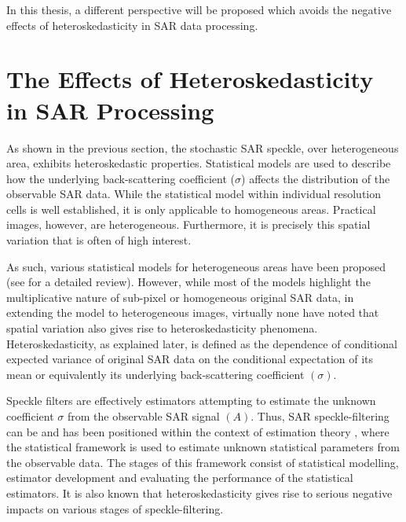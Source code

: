 In this thesis, a different perspective will be proposed which avoids the negative effects of heteroskedasticity in SAR data processing.
 
\section{The Effects of Heteroskedasticity in SAR Processing}%
\label{sec:heteroskedastic_sar_processing}


As shown in the previous section,
  the stochastic SAR speckle, over heterogeneous area, exhibits heteroskedastic properties.
Statistical models are used to describe how the underlying back-scattering coefficient ($\sigma$) affects the distribution of the observable SAR data. 
While the statistical model within individual resolution cells is well established,
  it is only applicable to homogeneous areas.
Practical images, however, are heterogeneous.
Furthermore, it is precisely this spatial variation that is often of high interest.

As such, various statistical models for heterogeneous areas have been proposed (see \cite{Touzi_2002_TGRS} for a detailed review). 
However, while most of the models highlight the multiplicative nature of sub-pixel or homogeneous original SAR data, in extending the model to heterogeneous images, virtually none have noted that spatial variation also gives rise to heteroskedasticity phenomena. 
Heteroskedasticity, as explained later, is defined as the dependence of conditional expected variance of original SAR data on the conditional expectation of its mean or equivalently its underlying back-scattering coefficient $(\sigma)$. 

Speckle filters are effectively estimators attempting to estimate the unknown coefficient $\sigma$ from the observable SAR signal $(A)$. 
Thus, SAR speckle-filtering can be and has been positioned within the context of estimation theory \cite{Touzi_2002_TGRS}, where
the statistical framework is used to estimate unknown statistical parameters from the observable data. 
The stages of this framework consist of statistical modelling, estimator development and evaluating the performance of the statistical estimators. 
It is also known that heteroskedasticity gives rise to serious negative impacts on various stages of speckle-filtering. 


